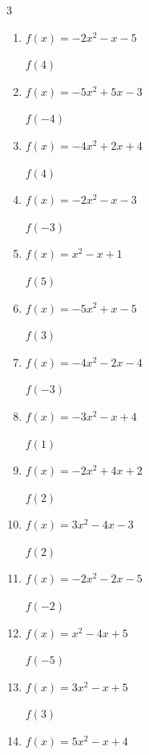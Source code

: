 \begin{multicols}{3}
\begin{enumerate}
$f(2)$
        \phantom{$= -16$}

  \item $f(x)=-2x^{2}-x-5$

$f(4)$
        \phantom{$= -41$}

  \item $f(x)=-5x^{2}+5x-3$

$f(-4)$
        \phantom{$= -103$}

  \item $f(x)=-4x^{2}+2x+4$

$f(4)$
        \phantom{$= -52$}

  \item $f(x)=-2x^{2}-x-3$

$f(-3)$
        \phantom{$= -18$}

  \item $f(x)=x^{2}-x+1$

$f(5)$
        \phantom{$= 21$}

  \item $f(x)=-5x^{2}+x-5$

$f(3)$
        \phantom{$= -47$}

  \item $f(x)=-4x^{2}-2x-4$

$f(-3)$
        \phantom{$= -34$}

  \item $f(x)=-3x^{2}-x+4$

$f(1)$
        \phantom{$= 0$}

\columnbreak %

  \item $f(x)=-2x^{2}+4x+2$

$f(2)$
        \phantom{$= 2$}

  \item $f(x)=3x^{2}-4x-3$

$f(2)$
        \phantom{$= 1$}

  \item $f(x)=-2x^{2}-2x-5$

$f(-2)$
        \phantom{$= -9$}

  \item $f(x)=x^{2}-4x+5$

$f(-5)$
        \phantom{$= 50$}

  \item $f(x)=3x^{2}-x+5$

$f(3)$
        \phantom{$= 29$}

  \item $f(x)=5x^{2}-x+4$


\end{enumerate}
\end{multicols}
